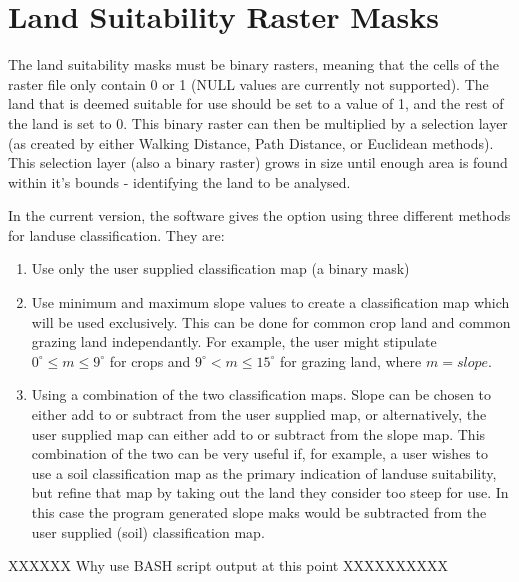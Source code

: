 \section{Land Suitability Raster Masks} 

The land suitability masks must be binary rasters, meaning that the cells of
the raster file only contain 0 or 1 (NULL values are currently not supported).
The land that is deemed suitable for use should be set to a value of 1, and the
rest of the land is set to 0.  This binary raster  can then be multiplied by a
selection layer (as created by either Walking Distance, Path Distance,
or Euclidean methods).  This selection layer (also a binary raster) grows in size until enough area is
found within it's bounds - identifying the land to be analysed.

In the current version, the software gives the option using three different
methods for landuse classification.  They are: 

\begin{enumerate} 

\item  Use only the user supplied classification map (a binary mask) 

\item  Use minimum and maximum slope values to create a classification map
which will be used exclusively.  This can be done for common crop land and
common grazing land independantly.  For example, the user might stipulate
$0^\circ \leq m \leq 9^\circ$ for crops and $9^\circ < m \leq 15^\circ$ for
grazing land, where $m=slope$.  

\item  Using a combination of the two classification maps.  Slope can be chosen
to either add to or subtract from the user supplied map, or alternatively, the
user supplied map can either add to or subtract from the slope map.  This
combination of the two can be very useful if, for example, a user wishes to use
a soil classification map as the primary indication of landuse suitability, but
refine that map by taking out the land they consider too steep for use.  In
this case the program generated slope maks would be subtracted from the user
supplied (soil) classification map.  

\end{enumerate}


XXXXXX Why use BASH script output at this point XXXXXXXXXX


